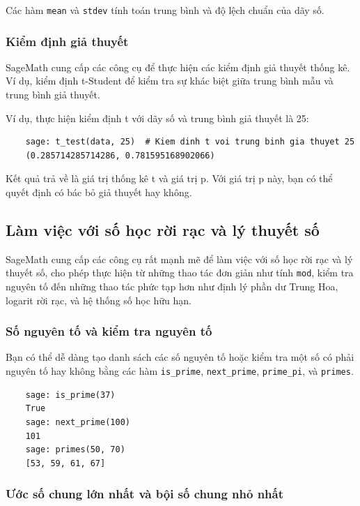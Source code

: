 Các hàm \texttt{mean} và \texttt{stdev} tính toán trung bình và độ lệch chuẩn của dãy số.

\subsubsection{Kiểm định giả thuyết}

SageMath cung cấp các công cụ để thực hiện các kiểm định giả thuyết thống kê. Ví dụ, kiểm định t-Student để kiểm tra sự khác biệt giữa trung bình mẫu và trung bình giả thuyết.

Ví dụ, thực hiện kiểm định t với dãy số và trung bình giả thuyết là 25:

\begin{lstlisting}
	sage: t_test(data, 25)  # Kiem dinh t voi trung binh gia thuyet 25
	(0.285714285714286, 0.781595168902066)
\end{lstlisting}

Kết quả trả về là giá trị thống kê t và giá trị p. Với giá trị p này, bạn có thể quyết định có bác bỏ giả thuyết hay không.


\subsection{Làm việc với số học rời rạc và lý thuyết số}

SageMath cung cấp các công cụ rất mạnh mẽ để làm việc với số học rời rạc và lý thuyết số, cho phép thực hiện từ những thao tác đơn giản như tính \texttt{mod}, kiểm tra nguyên tố đến những thao tác phức tạp hơn như định lý phần dư Trung Hoa, logarit rời rạc, và hệ thống số học hữu hạn.

\subsubsection{Số nguyên tố và kiểm tra nguyên tố}

Bạn có thể dễ dàng tạo danh sách các số nguyên tố hoặc kiểm tra một số có phải nguyên tố hay không bằng các hàm \texttt{is\_prime}, \texttt{next\_prime}, \texttt{prime\_pi}, và \texttt{primes}.

\begin{lstlisting}
	sage: is_prime(37)
	True
	sage: next_prime(100)
	101
	sage: primes(50, 70)
	[53, 59, 61, 67]
\end{lstlisting}

\subsubsection{Ước số chung lớn nhất và bội số chung nhỏ nhất}

